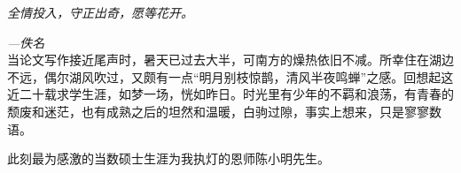 
\begin{thanks}


\emph{\kaishu 全情投入，守正出奇，愿等花开。}

\emph{\kaishu \hfill ---佚名}\\

当论文写作接近尾声时，暑天已过去大半，可南方的燥热依旧不减。所幸住在湖边不远，偶尔湖风吹过，又颇有一点“明月别枝惊鹊，清风半夜鸣蝉”之感。回想起这近二十载求学生涯，如梦一场，恍如昨日。时光里有少年的不羁和浪荡，有青春的颓废和迷茫，也有成熟之后的坦然和温暖，白驹过隙，事实上想来，只是寥寥数语。

此刻最为感激的当数硕士生涯为我执灯的恩师陈小明先生。






\end{thanks}
